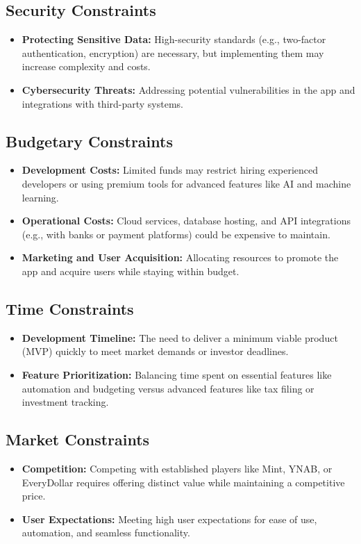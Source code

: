 \subsection{Security Constraints}
\begin{itemize}
    \item \textbf{Protecting Sensitive Data:} High-security standards (e.g., two-factor authentication, encryption) are necessary, but implementing them may increase complexity and costs.
    \item \textbf{Cybersecurity Threats:} Addressing potential vulnerabilities in the app and integrations with third-party systems.
\end{itemize}

\subsection{Budgetary Constraints}
\begin{itemize}
    \item \textbf{Development Costs:} Limited funds may restrict hiring experienced developers or using premium tools for advanced features like AI and machine learning.
    \item \textbf{Operational Costs:} Cloud services, database hosting, and API integrations (e.g., with banks or payment platforms) could be expensive to maintain.
    \item \textbf{Marketing and User Acquisition:} Allocating resources to promote the app and acquire users while staying within budget.
\end{itemize}

\subsection{Time Constraints}
\begin{itemize}
    \item \textbf{Development Timeline:} The need to deliver a minimum viable product (MVP) quickly to meet market demands or investor deadlines.
    \item \textbf{Feature Prioritization:} Balancing time spent on essential features like automation and budgeting versus advanced features like tax filing or investment tracking.
\end{itemize}

\subsection{Market Constraints}
\begin{itemize}
    \item \textbf{Competition:} Competing with established players like Mint, YNAB, or EveryDollar requires offering distinct value while maintaining a competitive price.
    \item \textbf{User Expectations:} Meeting high user expectations for ease of use, automation, and seamless functionality.
\end{itemize}

